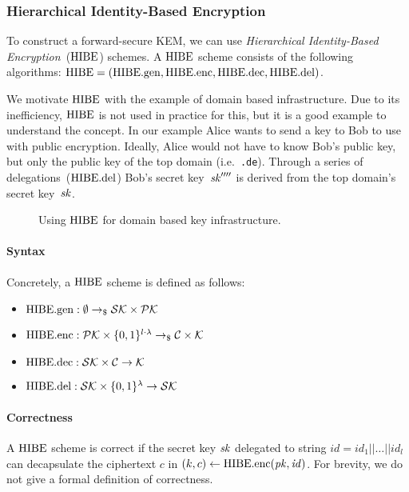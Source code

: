 \subsubsection{Hierarchical Identity-Based Encryption}
\label{sec:hibe}
To construct a forward-secure KEM, we can use \emph{Hierarchical Identity-Based Encryption}~($\mathrm{HIBE}$) schemes.
A $\mathrm{HIBE}$ scheme consists of the following algorithms: $\mathrm{HIBE} = (\mathrm{HIBE}.\mathrm{gen},\mathrm{HIBE}.\mathrm{enc},\mathrm{HIBE}.\mathrm{dec}, \mathrm{HIBE}.\mathrm{del})$.

We motivate $\mathrm{HIBE}$ with the example of domain based infrastructure.
Due to its inefficiency, $\mathrm{HIBE}$ is not used in practice for this, but it is a good example to understand the concept.
In our example Alice wants to send a key to Bob to use with public encryption.
Ideally, Alice would not have to know Bob's public key, but only the public key of the top domain (i.e.\ \texttt{.de}).
Through a series of delegations~($\mathrm{HIBE}.\mathrm{del}$) Bob's secret key~$\mathit{sk}''''$ is derived from the top domain's secret key~$\mathit{sk}$.

\begin{figure}[!ht]
    \centering
    
    \caption{Using $\mathrm{HIBE}$ for domain based key infrastructure.}
    \label{fig:hibe:example}
\end{figure}

\paragraph{Syntax} Concretely, a $\mathrm{HIBE}$ scheme is defined as follows:
\begin{itemize}
    \item $\mathrm{HIBE}.\mathrm{gen} : \emptyset \to_\$ \mathcal{SK}\times\mathcal{PK}$
    \item $\mathrm{HIBE}.\mathrm{enc}: \mathcal{PK}\times\{0,1\}^{l\cdot\lambda} \to_\$ \mathcal{C}\times\mathcal{K}$
    \item $\mathrm{HIBE}.\mathrm{dec}: \mathcal{SK}\times\mathcal{C} \to \mathcal{K}$
    \item $\mathrm{HIBE}.\mathrm{del}: \mathcal{SK}\times\{0,1\}^\lambda \to \mathcal{SK}$
\end{itemize}

\paragraph{Correctness} A $\mathrm{HIBE}$ scheme is correct if the secret key $\mathit{sk}$ delegated to string $\mathit{id}=\mathit{id}_1||\dots||\mathit{id}_l$ can decapsulate the ciphertext $c$ in $(k,c) \gets \mathrm{HIBE}.\mathrm{enc}(\mathit{pk},\mathit{id})$.
For brevity, we do not give a formal definition of correctness.

